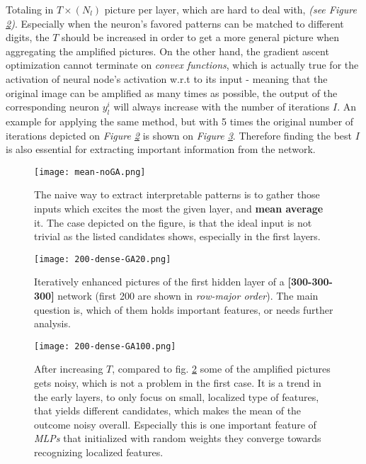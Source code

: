 Totaling in $T\times(N_l)$ picture per layer, which are hard to deal with, \emph{(see Figure \ref{fig:dense})}. 
Especially when the neuron's favored patterns can be matched to different digits, 
the $T$ should be increased in order to get a more general picture when aggregating the amplified pictures.
On the other hand, the gradient ascent optimization cannot terminate on \emph{convex functions}, which is actually true for the activation of neural node's activation w.r.t to its input - meaning that the original image can be amplified as many times as possible, the output of the corresponding neuron $y_l^i$ will always increase with the number of iterations $I$. An example for applying the same method, but with 5 times the original number of iterations depicted on \emph{Figure \ref{fig:dense}} is shown on \emph{Figure \ref{fig:dense-100}}.
Therefore finding the best $I$ is also essential for extracting important information from the network.


\begin{figure}
    \centering
    \texttt{[image: mean-noGA.png]}
    \caption{The naive way to extract interpretable patterns is to gather those inputs which excites the most the given layer, and \textbf{mean average} it. The case depicted on the figure, is that the ideal input is not trivial as the listed candidates shows, especially in the first layers.}
    \label{fig:mean}
\end{figure}


\begin{figure}
    \centering
    \texttt{[image: 200-dense-GA20.png]}
    \caption{Iteratively enhanced pictures of the first hidden layer of a \textbf{[300-300-300]} network (first 200 are shown in \emph{row-major order}). The main question is, which of them holds important features, or needs further analysis.}
    \label{fig:dense}
\end{figure}


\begin{figure}
    \centering
    \texttt{[image: 200-dense-GA100.png]}
    \caption{After increasing $T$, compared to fig. \ref{fig:dense} some of the amplified pictures gets noisy, which is not a problem in the first case. It is a trend in the early layers, to only focus on small, localized type of features, that yields different candidates, which makes the mean of the outcome noisy overall. Especially this is one important feature of \emph{MLPs} that initialized with random weights they converge towards recognizing localized features.}
    \label{fig:dense-100}
\end{figure}